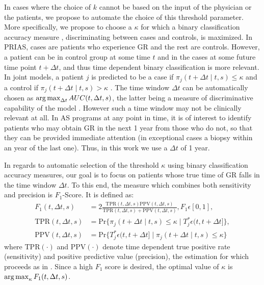 In cases where the choice of $k$ cannot be based on the input of the physician or the patients, we propose to automate the choice of this threshold parameter. More specifically, we propose to choose a $\kappa$ for which a binary classification accuracy measure \citep{lopez2014optimalcutpoints,sokolova2009systematic}, discriminating between cases and controls, is maximized. In PRIAS, cases are patients who experience GR and the rest are controls. However, a patient can be in control group at some time $t$ and in the cases at some future time point $t + \Delta t$, and thus time dependent binary classification is more relevant. In joint models, a patient $j$ is predicted to be a case if $\pi_j(t + \Delta t \mid t,s) \leq \kappa$ and a control if $\pi_j(t + \Delta t \mid t,s) > \kappa$ \citep{rizopoulosJMbayes}. The time window $\Delta t$ can be automatically chosen as $\operatorname{arg\,max}_{\Delta t}AUC(t, \Delta t, s)$, the latter being a measure of discriminative capability of the model \citep{rizopoulosJMbayes}. However such a time window may not be clinically relevant at all. In AS programs at any point in time, it is of interest to identify patients who may obtain GR in the next 1 year from those who do not, so that they can be provided immediate attention (in exceptional cases a biopsy within an year of the last one). Thus, in this work we use a $\Delta t$ of 1 year.

In regards to automatic selection of the threshold $\kappa$ using binary classification accuracy measures, our goal is to focus on patients whose true time of GR falls in the time window $\Delta t$. To this end, the measure which combines both sensitivity and precision is $F_1$-Score. It is defined as:
\begin{align*}
F_1(t, \Delta t, s) &= 2\frac{\mbox{TPR}(t, \Delta t, s) \mbox{PPV}(t, \Delta t, s)}{\mbox{TPR}(t, \Delta t, s) + \mbox{PPV}(t, \Delta t, s)}, F_1 \epsilon [0,1],\\
\mbox{TPR}(t, \Delta t, s) &= \mbox{Pr}\big\{\pi_j(t + \Delta t \mid t,s) \leq \kappa \mid T^*_j \epsilon (t, t + \Delta t]\big\},\\
\mbox{PPV}(t, \Delta t, s) &= \mbox{Pr}\big\{T^*_j \epsilon (t, t + \Delta t] \mid \pi_j(t + \Delta t \mid t,s) \leq \kappa \big\}
\end{align*}
where $\mbox{TPR}(\cdot)$ and $\mbox{PPV}(\cdot)$ denote time dependent true positive rate (sensitivity) and positive predictive value (precision), the estimation for which proceeds as in \citet{rizopoulosJMbayes}. Since a high $F_1$ score is desired, the optimal value of $\kappa$ is $\operatorname{arg\,max}_{\kappa} F_1(t, \Delta t, s)$.